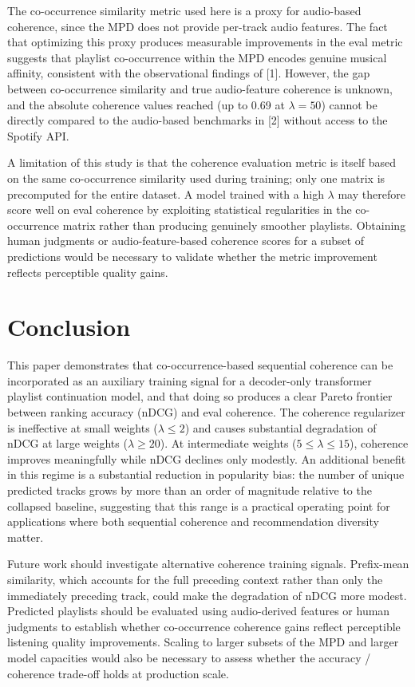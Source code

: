 \documentclass[conference]{IEEEtran}
\begin{document}
The co-occurrence similarity metric used here is a proxy for audio-based coherence, since the MPD does not provide
per-track audio features. The fact that optimizing this proxy produces measurable improvements in the eval metric 
suggests that playlist co-occurrence within the MPD encodes genuine musical affinity, consistent with the observational findings of 
[1]. However, the gap between co-occurrence similarity and true audio-feature coherence is unknown, and the absolute 
coherence values reached (up to 0.69 at $\lambda=50$) cannot be directly compared to the audio-based benchmarks in [2] 
without access to the Spotify API.

A limitation of this study is that the coherence evaluation metric is itself based on the same co-occurrence similarity 
used during training; only one matrix is precomputed for the entire dataset. A model trained with a high $\lambda$ 
may therefore score well on eval coherence by exploiting statistical regularities in the co-occurrence matrix rather than 
producing genuinely smoother playlists. Obtaining human judgments or audio-feature-based coherence scores for a 
subset of predictions would be necessary to validate whether the metric improvement reflects perceptible quality gains.

\section{Conclusion}

This paper demonstrates that co-occurrence-based sequential coherence can be incorporated as an auxiliary training 
signal for a decoder-only transformer playlist continuation model, and that doing so produces a clear Pareto frontier 
between ranking accuracy (nDCG) and eval coherence. The coherence regularizer is ineffective at small weights ($\lambda \leq 2$) 
and causes substantial degradation of nDCG at large weights ($\lambda \geq 20$). At intermediate weights ($5 \leq \lambda \leq 15$), 
coherence improves meaningfully while nDCG declines only modestly. An additional benefit in this regime is a
substantial reduction in popularity bias: the number of unique predicted tracks grows by more than an order of
magnitude relative to the collapsed baseline, suggesting that this range is a practical operating point for
applications where both sequential coherence and recommendation diversity matter.

Future work should investigate alternative coherence training signals. Prefix-mean similarity, which 
accounts for the full preceding context rather than only the immediately preceding track, could make the degradation of nDCG more modest.
Predicted playlists should be evaluated using audio-derived features or human judgments to establish whether co-occurrence coherence gains reflect 
perceptible listening quality improvements. Scaling to larger subsets of the MPD and larger model capacities would also 
be necessary to assess whether the accuracy / coherence trade-off holds at production scale.
\end{document}
